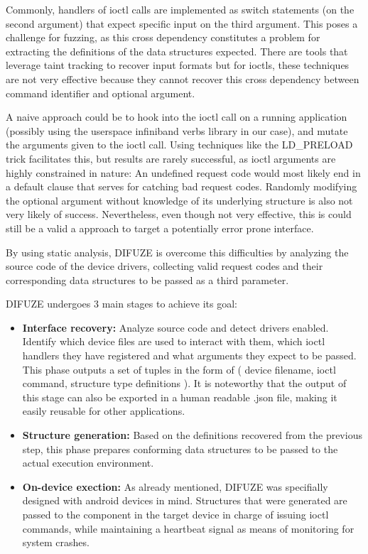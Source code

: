 Commonly, handlers of ioctl calls are implemented as switch statements (on the second argument) that expect specific
input on the third argument. This poses a challenge for fuzzing, as this cross dependency constitutes a problem for extracting
the definitions of the data structures expected. There are tools that leverage taint tracking to recover input formats\cite{buzzfuzz}\cite{dowser}
but for ioctls, these techniques are not very effective\cite{corinaDIFUZEInterfaceAware2017} because they cannot recover this cross dependency between command identifier
and optional argument.

A naive approach could be to hook into the ioctl call on a running application (possibly using the userspace infiniband verbs library
in our case), and mutate the arguments given to the ioctl call. Using techniques like the LD\_PRELOAD trick facilitates this,
but results are rarely successful, as ioctl arguments are highly constrained in nature: An undefined request code
would most likely end in a default clause that serves for catching bad request codes. Randomly modifying the optional argument
without knowledge of its underlying structure is also not very likely of success.
Nevertheless, even though not very effective, this is could still be a valid a approach to target a potentially error prone interface.

By using static analysis, DIFUZE is overcome this difficulties by analyzing the source code of the device drivers,
collecting valid request codes and their corresponding data structures to be passed as a third parameter.

DIFUZE undergoes 3 main stages to achieve its goal:

\begin{itemize}
  \item \textbf{Interface recovery:} Analyze source code and detect drivers enabled. Identify which device files are used to interact with them, which ioctl handlers they have registered and what arguments they expect to be passed. This phase outputs a set of tuples in the form of ( device filename, ioctl command, structure type definitions ). It is noteworthy that the output of this stage can also be exported in a human readable .json file, making it easily reusable for other applications.
  \item \textbf{Structure generation:} Based on the definitions recovered from the previous step, this phase prepares conforming data structures to be passed to the actual execution environment.
  \item \textbf{On-device exection:} As already mentioned, DIFUZE was specifially designed with android devices in mind. Structures that were generated are passed to the component in the target device in charge of issuing ioctl commands, while maintaining a heartbeat signal as means of monitoring for system crashes.
\end{itemize}

